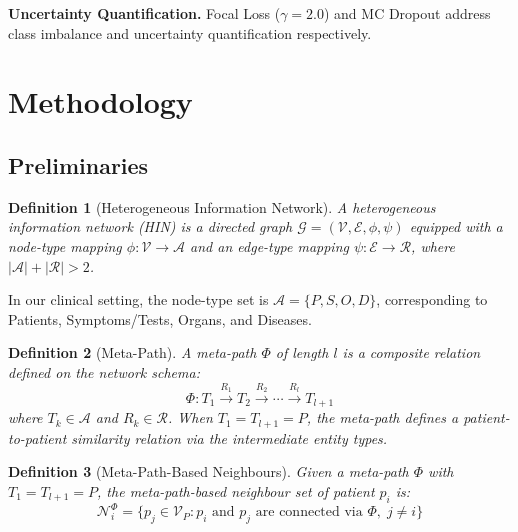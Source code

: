 \documentclass[conference]{IEEEtran}
\newtheorem{definition}{Definition}
\begin{document}
\textbf{Uncertainty Quantification.}
Focal Loss \cite{lin_2017} ($\gamma = 2.0$) and MC Dropout \cite{gal_2016}
address class imbalance and uncertainty quantification respectively.

\section{Methodology}
\label{sec:method}

\subsection{Preliminaries}
\label{subsec:preliminaries}

\begin{definition}[Heterogeneous Information Network]
A \emph{heterogeneous information network} (HIN) is a directed graph
$\mathcal{G} = (\mathcal{V}, \mathcal{E}, \phi, \psi)$
equipped with a node-type mapping $\phi : \mathcal{V} \to \mathcal{A}$
and an edge-type mapping $\psi : \mathcal{E} \to \mathcal{R}$,
where $|\mathcal{A}| + |\mathcal{R}| > 2$.
\end{definition}

In our clinical setting, the node-type set is
$\mathcal{A} = \{P, S, O, D\}$, corresponding to Patients,
Symptoms/Tests, Organs, and Diseases.

\begin{definition}[Meta-Path]
\label{def:metapath}
A \emph{meta-path} $\Phi$ of length $l$ is a composite relation
defined on the network schema:
\begin{equation}
  \Phi : T_1 \xrightarrow{R_1} T_2 \xrightarrow{R_2}
         \cdots \xrightarrow{R_l} T_{l+1}
\end{equation}
where $T_k \in \mathcal{A}$ and $R_k \in \mathcal{R}$.
When $T_1 = T_{l+1} = P$, the meta-path defines a patient-to-patient
similarity relation via the intermediate entity types.
\end{definition}

\begin{definition}[Meta-Path-Based Neighbours]
\label{def:mpneighbors}
Given a meta-path $\Phi$ with $T_1 = T_{l+1} = P$,
the \emph{meta-path-based neighbour set} of patient $p_i$ is:
\begin{equation}
  \mathcal{N}_i^{\Phi} = \{p_j \in \mathcal{V}_P :
    p_i \text{ and } p_j \text{ are connected via } \Phi,\; j \neq i\}
\end{equation}
\end{definition}
\end{document}
